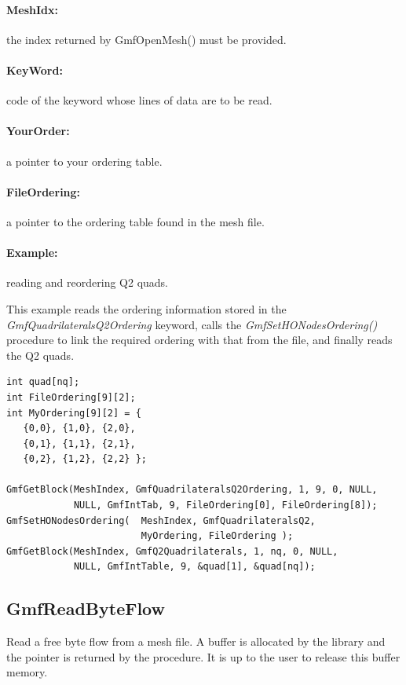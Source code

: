 \documentclass[a4paper,12pt]{article}
\begin{document}
\paragraph{MeshIdx:}
the index returned by GmfOpenMesh() must be provided.

\paragraph{KeyWord:} code of the keyword whose lines of data are to be read.

\paragraph{YourOrder:} a pointer to your ordering table.

\paragraph{FileOrdering:} a pointer to the ordering table found in the mesh file.

\paragraph{Example:} reading and reordering Q2 quads.

This example reads the ordering information stored in the \emph{GmfQuadrilateralsQ2Ordering} keyword, calls the \emph{GmfSetHONodesOrdering()} procedure to link the required ordering with that from the file, and finally reads the Q2 quads.

\begin{tt}
\begin{verbatim}
int quad[nq];
int FileOrdering[9][2];
int MyOrdering[9][2] = {
   {0,0}, {1,0}, {2,0},
   {0,1}, {1,1}, {2,1},
   {0,2}, {1,2}, {2,2} };

GmfGetBlock(MeshIndex, GmfQuadrilateralsQ2Ordering, 1, 9, 0, NULL,
            NULL, GmfIntTab, 9, FileOrdering[0], FileOrdering[8]);
GmfSetHONodesOrdering(  MeshIndex, GmfQuadrilateralsQ2,
                        MyOrdering, FileOrdering );
GmfGetBlock(MeshIndex, GmfQ2Quadrilaterals, 1, nq, 0, NULL,
            NULL, GmfIntTable, 9, &quad[1], &quad[nq]);
\end{verbatim}
\end{tt}
\normalfont


\subsection{GmfReadByteFlow}
Read a free byte flow from a mesh file.
A buffer is allocated by the library and the pointer is returned by the procedure.
It is up to the user to release this buffer memory.
\end{document}
